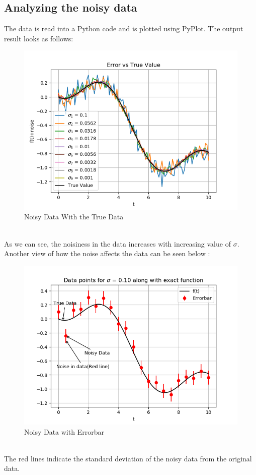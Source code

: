 \documentclass[11pt, a4paper]{article}
\begin{document}
\subsection{Analyzing the noisy data}
The data is read into a Python code and is plotted using PyPlot. The output result looks as follows:
   \begin{figure}[!tbh]
   	\centering
   	\includegraphics[scale=0.5]{./../Extras/NoisewithTrue.png}  %
       \caption{Noisy Data With the True Data}
   	\label{fig:noisytrue}
   \end{figure}
\\As we can see, the noisiness in the data increases with increasing value of $\sigma$. Another view of how the noise affects the data can be seen below :
   \begin{figure}[!tbh]
    \centering
    \includegraphics[scale=0.5]{./../Extras/NoiseErrorbar.png}  %
    \caption{Noisy Data with Errorbar}
    \label{fig:noiseerr}
\end{figure}
\\The red lines indicate the standard deviation of the noisy data from the original data.
\end{document}
